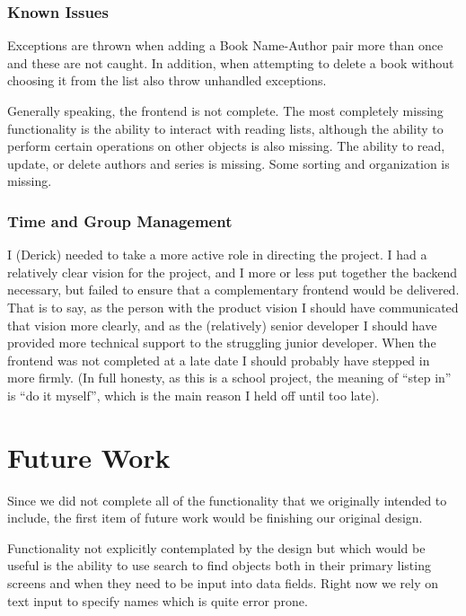 \documentclass{article}
\begin{document}
\subsubsection*{Known Issues}

Exceptions are thrown when adding a Book Name-Author pair more than once and
these are not caught. In addition, when attempting to delete a book without
choosing it from the list also throw unhandled exceptions.

Generally speaking,
the frontend is not complete.
The most completely missing functionality is
the ability to interact with reading lists,
although the ability to perform certain operations
on other objects is also missing.
The ability to read, update, or delete authors and series is missing.
Some sorting and organization is missing.

\subsubsection{Time and Group Management}

I (Derick) needed to take a more active role in directing the project.
I had a relatively clear vision for the project,
and I more or less put together the backend necessary,
but failed to ensure that a complementary frontend would be delivered.
That is to say,
as the person with the product vision
I should have communicated that vision more clearly,
and as the (relatively) senior developer
I should have provided more technical support
to the struggling junior developer.
When the frontend was not completed at a late date
I should probably have stepped in more firmly.
(In full honesty,
as this is a school project,
the meaning of ``step in'' is ``do it myself'',
which is the main reason I held off until too late).

\section*{Future Work}

Since we did not complete all of the functionality
that we originally intended to include,
the first item of future work would be finishing our original design.

Functionality not explicitly contemplated by the design
but which would be useful
is the ability to use search to find objects
both in their primary listing screens
and when they need to be input into data fields.
Right now we rely on text input to specify names
which is quite error prone.
\end{document}
